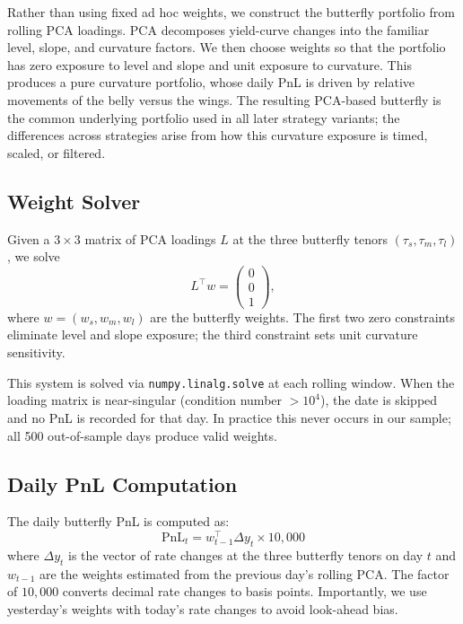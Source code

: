 \documentclass[11pt,a4paper]{article}
\begin{document}
Rather than using fixed ad hoc weights, we construct the butterfly
portfolio from rolling PCA loadings.  PCA decomposes yield-curve changes
into the familiar level, slope, and curvature factors.  We then choose
weights so that the portfolio has zero exposure to level and slope and
unit exposure to curvature.  This produces a pure curvature portfolio,
whose daily PnL is driven by relative movements of the belly versus the
wings.  The resulting PCA-based butterfly is the common underlying
portfolio used in all later strategy variants; the differences across
strategies arise from how this curvature exposure is timed, scaled, or
filtered.

\subsection{Weight Solver}
Given a $3 \times 3$ matrix of PCA loadings $L$ at the three butterfly
tenors $(\tau_s, \tau_m, \tau_l)$, we solve
\begin{equation}
L^{\!\top} w = \begin{pmatrix} 0 \\ 0 \\ 1 \end{pmatrix},
\label{eq:weights}
\end{equation}
where $w = (w_s, w_m, w_l)$ are the butterfly weights.  The first two
zero constraints eliminate level and slope exposure; the third constraint
sets unit curvature sensitivity.

This system is solved via \texttt{numpy.linalg.solve} at each rolling
window.  When the loading matrix is near-singular (condition
number $> 10^{4}$), the date is skipped and no PnL is recorded for that
day.  In practice this never occurs in our sample; all 500
out-of-sample days produce valid weights.

\subsection{Daily PnL Computation}
The daily butterfly PnL is computed as:
\begin{equation}
\text{PnL}_t = w_{t-1}^{\!\top} \Delta y_t \times 10,000
\label{eq:pnl}
\end{equation}
where $\Delta y_t$ is the vector of rate changes at the three butterfly
tenors on day $t$ and $w_{t-1}$ are the weights estimated from the
previous day's rolling PCA.  The factor of $10{,}000$ converts decimal
rate changes to basis points.  Importantly, we use yesterday's weights
with today's rate changes to avoid look-ahead bias.
\end{document}

